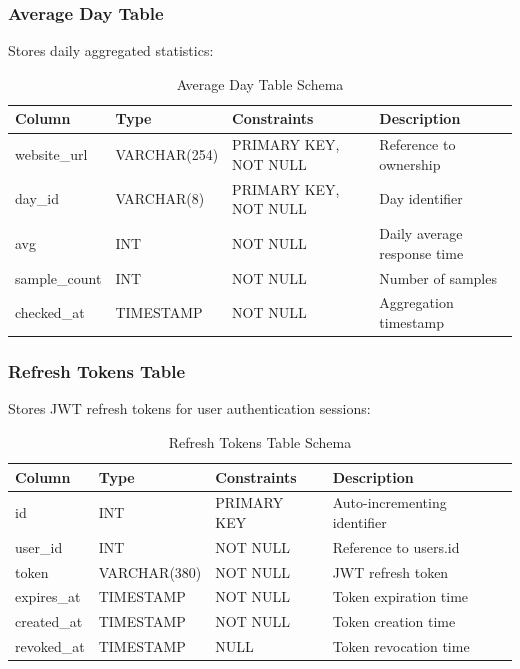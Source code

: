\subsubsection{Average Day Table}

Stores daily aggregated statistics:

\begin{table}[H]
    \centering
    \caption{Average Day Table Schema}
    \label{tab:avgday-schema}
    \begin{tabular}{llll}
        \toprule
        \textbf{Column} & \textbf{Type} & \textbf{Constraints} & \textbf{Description} \\
        \midrule
        website\_url & VARCHAR(254) & PRIMARY KEY, NOT NULL & Reference to ownership \\
        day\_id & VARCHAR(8) & PRIMARY KEY, NOT NULL & Day identifier \\
        avg & INT & NOT NULL & Daily average response time \\
        sample\_count & INT & NOT NULL & Number of samples \\
        checked\_at & TIMESTAMP & NOT NULL & Aggregation timestamp \\
        \bottomrule
    \end{tabular}
\end{table}

\subsubsection{Refresh Tokens Table}

Stores JWT refresh tokens for user authentication sessions:

\begin{table}[H]
    \centering
    \caption{Refresh Tokens Table Schema}
    \label{tab:refresh-tokens-schema}
    \begin{tabular}{llll}
        \toprule
        \textbf{Column} & \textbf{Type} & \textbf{Constraints} & \textbf{Description} \\
        \midrule
        id & INT & PRIMARY KEY & Auto-incrementing identifier \\
        user\_id & INT & NOT NULL & Reference to users.id \\
        token & VARCHAR(380) & NOT NULL & JWT refresh token \\
        expires\_at & TIMESTAMP & NOT NULL & Token expiration time \\
        created\_at & TIMESTAMP & NOT NULL & Token creation time \\
        revoked\_at & TIMESTAMP & NULL & Token revocation time \\
        \bottomrule
    \end{tabular}
\end{table}


